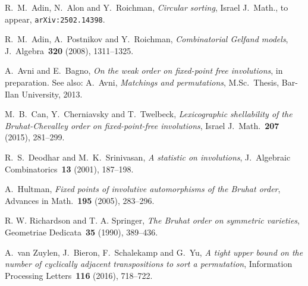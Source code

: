 \documentclass[11pt]{amsart}
\numberwithin{equation}{section}
\begin{document}
\begin{thebibliography}{}
    R.\ M.\ Adin, N.\ Alon and  Y.\ Roichman, 
    {\em Circular sorting}, 
    Israel J.\ Math., to appear, {\tt arXiv:2502.14398}. 

    R.\ M.\ Adin, A.\ Postnikov and  Y.\ Roichman, 
    {\em Combinatorial Gelfand models},
    J.\ Algebra~{\bf 320} (2008), 1311--1325.

    A.\ Avni and E.\ Bagno, 
    {\em On the weak order on fixed-point free involutions}, in preparation. 
    See also: 
    A.\ Avni, 
    {\em Matchings and permutations}, 
    M.Sc.~Thesis, Bar-Ilan University, 2013. 

    M.\ B.\ Can, Y.\ Cherniavsky and T.\ Twelbeck, 
    {\em Lexicographic shellability of the Bruhat-Chevalley order on fixed-point-free involutions}, 
    Israel J.\ Math.~{\bf 207} (2015), 281--299. 

    R.\ S.\ Deodhar and M.\ K.\ Srinivasan, 
    {\em A statistic on involutions}, 
    J.\ Algebraic Combinatorics~{\bf 13} (2001), 187--198. 


    A.\ Hultman, 
    {\em Fixed points of involutive automorphisms of the Bruhat order}, 
    Advances in Math.~{\bf 195} (2005), 283--296. 

    R. W. Richardson and T. A. Springer, 
    {\em The Bruhat order on symmetric varieties}, 
    Geometriae Dedicata~{\bf 35} (1990), 389--436.

    A.\ van Zuylen, J.\ Bieron, F.\ Schalekamp and G.\ Yu,
    {\em A tight upper bound on the number of cyclically adjacent transpositions to sort a permutation},
    Information Processing Letters~{\bf 116} (2016), 718--722.
    
\end{thebibliography}
\end{document}
